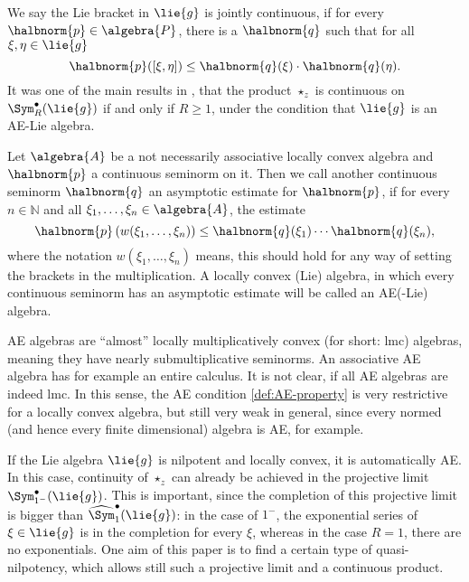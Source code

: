 \documentclass[
11pt,                          %
english                        %
]{article}
\begin{document}
We say the Lie bracket in $\lie{g}$ is jointly continuous, if for every $\halbnorm{p} \in \algebra{P}$, there is a $\halbnorm{q}$ such that for all $\xi, \eta \in \lie{g}$
\begin{equation}
	\label{eq:continuity-of-liebracket}
	\halbnorm{p}([\xi, \eta])
	\leq
	\halbnorm{q}(\xi) \cdot \halbnorm{q}(\eta).
\end{equation}
It was one of the main results in \cite{esposito.stapor.waldmann:2015a:pre}, that the product $\star_z$ is continuous on $\Sym_R^{\bullet}(\lie{g})$ if and only if 
$R \geq 1$, under the condition that $\lie{g}$ is an AE-Lie algebra.
\begin{definition}[AE-algebra]
	\label{def:AE-algebra}
	Let $\algebra{A}$ be a not necessarily associative locally convex algebra
	and $\halbnorm{p}$ a continuous seminorm on it. Then we call
	another continuous seminorm $\halbnorm{q}$ an asymptotic estimate for 
	$\halbnorm{p}$, if for every $n \in \mathbb{N}$ and all $\xi_1, \ldots, \xi_n
	\in \algebra{A}$, the estimate
	\begin{equation}
		\label{eq:def:AE-property}
		\halbnorm{p}\left(
			w(\xi_1, \ldots, \xi_n)
		\right)
		\leq
		\halbnorm{q}(\xi_1) \cdots \halbnorm{q}(\xi_n),
	\end{equation}
	where the notation $w(\xi_1, \ldots, \xi_n)$ means, this should hold for any
	way of setting the brackets in the multiplication. A locally convex (Lie) 
	algebra, in which every continuous seminorm has an asymptotic estimate will be 
	called an AE(-Lie) algebra.
\end{definition}
AE algebras are ``almost'' locally multiplicatively convex (for short: lmc) 
algebras, meaning they have nearly submultiplicative seminorms. An associative AE 
algebra has for example an entire calculus. It is not clear, if all AE algebras are 
indeed lmc. In this sense, the AE condition \eqref{def:AE-property} is very 
restrictive for a locally convex algebra, but still very weak in general, since 
every normed (and hence every finite dimensional) algebra is AE, for example.

If the Lie algebra $\lie{g}$ is nilpotent and locally convex, it is automatically 
AE. In this case, continuity of $\star_z$ can already be achieved in the projective 
limit $\Sym_{1^-}^{\bullet}(\lie{g})$. This is important, since the completion of 
this projective limit is bigger than $\widehat{\Sym}_1^{\bullet}(\lie{g})$: in the 
case of $1^-$, the exponential series of $\xi \in \lie{g}$ is in the completion for 
every $\xi$, whereas in the case $R = 1$, there are no exponentials. One aim of this 
paper is to find a certain type of quasi-nilpotency, which allows still such a 
projective limit and a continuous product.
\end{document}
